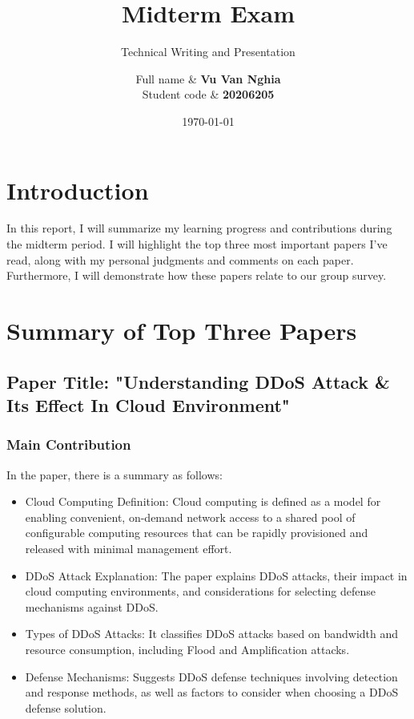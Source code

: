 \documentclass[12pt, twoside]{article}
\title{Midterm Exam}
\subtitle{Technical Writing and Presentation}
\author{
 Full name & \textbf{Vu Van Nghia} \\
 Student code & \textbf{20206205} \\[1cm]
}
\date{\today}
\begin{document}
\maketitlepage
\tableofcontents
\newpage
\section{Introduction}
In this report, I will summarize my learning progress and contributions during the midterm period. I will highlight the top three most important papers I've read, along with my personal judgments and comments on each paper. Furthermore, I will demonstrate how these papers relate to our group survey.
\section{Summary of Top Three Papers}
\subsection{Paper Title: "Understanding DDoS Attack \& Its Effect In Cloud Environment" \cite{deshmukh2015understanding}}

\subsubsection{Main Contribution}
In the paper, there is a summary as follows:
\begin{itemize}
    \item Cloud Computing Definition: Cloud computing is defined as a model for enabling convenient, on-demand network access to a shared pool of configurable computing resources that can be rapidly provisioned and released with minimal management effort.
    \item DDoS Attack Explanation: The paper explains DDoS attacks, their impact in cloud computing environments, and considerations for selecting defense mechanisms against DDoS.
    \item Types of DDoS Attacks: It classifies DDoS attacks based on bandwidth and resource consumption, including Flood and Amplification attacks.
    \item Defense Mechanisms: Suggests DDoS defense techniques involving detection and response methods, as well as factors to consider when choosing a DDoS defense solution.
\end{itemize}
\end{document}
